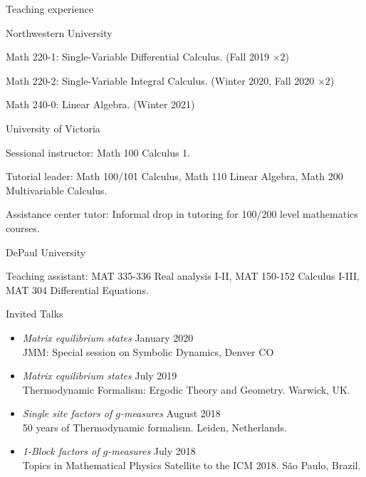 \documentclass{resume} %
\begin{document}
\begin{rSection}{Teaching experience}
	\begin{rSubsection}{Northwestern University}{}{}{}
		\item
		Math 220-1: Single-Variable Differential Calculus. (Fall 2019 $\times 2$)
		
		\item
		Math 220-2: Single-Variable Integral Calculus. (Winter 2020, Fall 2020 $\times 2$)
		
		\item
		Math 240-0: Linear Algebra. (Winter 2021)
		
	\end{rSubsection}
	
	\begin{rSubsection}{University of Victoria}{}{}{}
		\item 
		Sessional instructor: Math 100 Calculus 1.
		
		\item 
		Tutorial leader: Math 100/101 Calculus, Math 110 Linear Algebra, Math 200 Multivariable Calculus.
		
		\item 
		Assistance center tutor: Informal drop in tutoring for 100/200 level mathematics courses.
	\end{rSubsection}
	
	\begin{rSubsection}{DePaul University}{}{}{}
		\item
		Teaching assistant: MAT 335-336 Real analysis I-II, MAT 150-152 Calculus I-III, MAT 304 Differential Equations.
	\end{rSubsection}
	
\end{rSection}


\begin{rSection}{Invited Talks}

\begin{itemize}
	\item 
	\emph{Matrix equilibrium states} \hfill January 2020\\
	JMM: Special session on Symbolic Dynamics, Denver CO
	
	\item 
	\emph{Matrix equilibrium states} \hfill July 2019\\
	Thermodynamic Formalism: Ergodic Theory and Geometry. Warwick, UK.
	
	\item 
	\emph{Single site factors of $g$-measures} \hfill August 2018\\
	50 years of Thermodynamic formalism. Leiden, Netherlands.
	
	\item 
	\emph{1-Block factors of $g$-measures} \hfill July 2018\\
	Topics in Mathematical Physics Satellite to the ICM 2018. S\~ao Paulo, Brazil.
	
\end{itemize}

\end{rSection}
\end{document}
